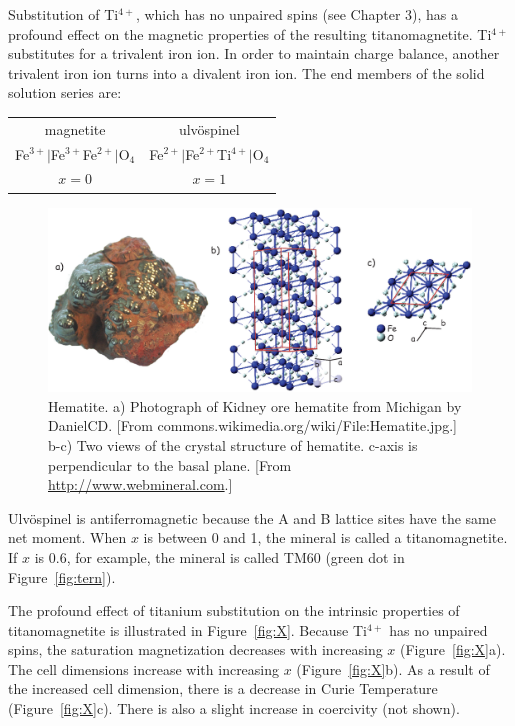 Substitution of Ti$^{4+}$, which has no unpaired spins (see Chapter 3),
 has a profound effect on the magnetic properties of the
resulting titanomagnetite.  Ti$^{4+}$ substitutes for a trivalent iron ion.
In order to maintain charge balance, another trivalent iron ion turns into a divalent iron
ion.  The end members of the solid solution series are:

\begin{center}
\begin{tabular}{cc}
\hline
 magnetite  &  ulv\"ospinel \\
 Fe$^{3+}|$Fe$^{3+}$Fe$^{2+}|$O$_4$  &  Fe$^{2+}|$Fe$^{2+}$Ti$^{4+}|$O$_4$ \\
 $x = 0 $ &  $x=1$  \\
\hline
\end{tabular}
\end{center}

\begin{figure}[htb]
\centering  \includegraphics[width=14 cm]{EPSfiles/hematite.eps}
\caption{Hematite. a) Photograph of Kidney ore hematite from Michigan by DanielCD. [From commons.wikimedia.org/wiki/File:Hematite.jpg.]   b-c) Two views of the crystal structure of hematite.  c-axis is perpendicular to the basal plane. [From \url{http://www.webmineral.com}.] }
\label{fig:hematite}
\end{figure} 


%
%
Ulv\" ospinel is antiferromagnetic because the A and B lattice sites have the
same net moment.  When $x$ is between 0 and 1, the mineral is called a
titanomagnetite.  If $x$ is 0.6,  for example, the mineral
is called TM60 (green dot in Figure~\ref{fig:tern}).  

%
The profound effect of titanium substitution on the intrinsic properties of titanomagnetite is illustrated in Figure~\ref{fig:X}.  Because Ti$^{4+}$ has no unpaired spins, the saturation magnetization decreases with increasing $x$ (Figure~\ref{fig:X}a).   The cell dimensions increase with increasing $x$ (Figure~\ref{fig:X}b).  As a result of the increased cell dimension, there is a decrease in
 Curie Temperature (Figure~\ref{fig:X}c).  There is also a    slight increase in  coercivity (not shown).  

